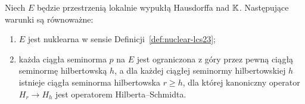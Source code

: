 \begin{twierdzenie}
\label{thm:hilbert-nuclear23}
Niech $E$ będzie przestrzenią lokalnie wypukłą Hausdorffa
nad $\mathbb K$. Następujące warunki są równoważne:
\begin{enumerate}[label=\textup{(\roman*)},leftmargin=*]
\item $E$ jest nuklearna w sensie
Definicji~\ref{def:nuclear-lcs23};
\item każda ciągła seminorma $p$ na $E$ jest ograniczona
z góry przez pewną ciągłą seminormę hilbertowską $h$,
a dla każdej ciągłej seminormy hilbertowskiej $h$ istnieje
ciągła seminorma hilbertowska $r\ge h$, dla której
kanoniczny operator $H_r\to H_h$ jest operatorem
Hilberta--Schmidta.
\end{enumerate}
\end{twierdzenie}
